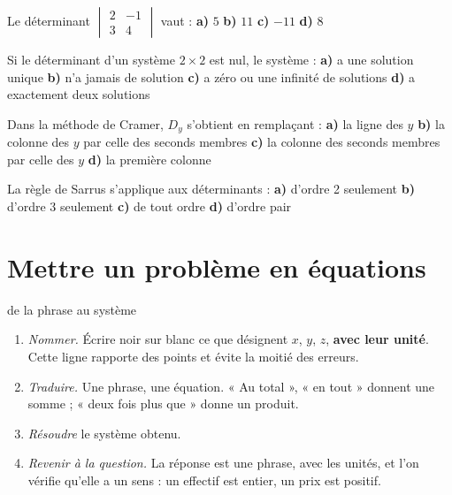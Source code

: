 \begin{qcm}
\exo Le déterminant $\begin{vmatrix} 2 & -1\\ 3 & 4\end{vmatrix}$ vaut :
\textbf{a)} $5$ \quad \textbf{b)} $11$ \quad \textbf{c)} $-11$ \quad
\textbf{d)} $8$ 

\exo Si le déterminant d'un système $2\times2$ est nul, le système :
\textbf{a)} a une solution unique \quad \textbf{b)} n'a jamais de solution
\quad \textbf{c)} a zéro ou une infinité de solutions \quad
\textbf{d)} a exactement deux solutions 

\exo Dans la méthode de Cramer, $D_{y}$ s'obtient en remplaçant :
\textbf{a)} la ligne des $y$ \quad \textbf{b)} la colonne des $y$ par celle
des seconds membres \quad \textbf{c)} la colonne des seconds membres par
celle des $y$ \quad \textbf{d)} la première colonne 

\exo La règle de Sarrus s'applique aux déterminants :
\textbf{a)} d'ordre 2 seulement \quad \textbf{b)} d'ordre 3 seulement \quad
\textbf{c)} de tout ordre \quad \textbf{d)} d'ordre pair 
\end{qcm}

\section{Mettre un problème en équations}

\begin{methode}{de la phrase au système}
\begin{enumerate}[label=\textbf{\arabic*.}, leftmargin=*, itemsep=0.15em]
  \item \emph{Nommer.} Écrire noir sur blanc ce que désignent $x$, $y$, $z$,
        \textbf{avec leur unité}. Cette ligne rapporte des points et évite la
        moitié des erreurs.
  \item \emph{Traduire.} Une phrase, une équation. « Au total », « en tout »
        donnent une somme ; « deux fois plus que » donne un produit.
  \item \emph{Résoudre} le système obtenu.
  \item \emph{Revenir à la question.} La réponse est une phrase, avec les
        unités, et l'on vérifie qu'elle a un sens : un effectif est entier,
        un prix est positif.
\end{enumerate}
\end{methode}

